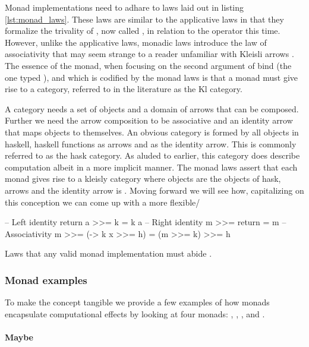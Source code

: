 Monad implementations need to adhare to laws laid out in listing
\ref{lst:monad_laws}. These laws are similar to the applicative laws
in that they formalize the trivality of , now called
, in relation to the  operator this
time. However, unlike the applicative laws, monadic laws introduce the
law of associativity that may seem strange to a reader unfamiliar with
Kleisli arrows \cite{dawsonCompoundMonadsKleisli2007}. The essence of
the monad, when focusing on the second argument of bind (the one typed
), and which is codified by the monad laws is that a
monad  must give rise to a category, referred to in the
literature as the Kl category.

A category needs a set of objects and a domain of arrows that can be
composed. Further we need the arrow composition to be associative and
an identity arrow that maps objects to themselves. An obvious category
is formed by all objects in haskell, haskell functions as arrows and
 as the identity arrow. This is commonly referred to as
the hask category. As aluded to earlier, this category does describe
computation albeit in a more implicit manner. The monad laws assert
that each monad gives rise to a kleisly category where objects are the
objects of hask, arrows  and the identity arrow is
. Moving forward we will see how, capitalizing on this
conception we can come up with a more flexible/

\begin{code}
\begin{haskellcode}
-- Left identity
return a >>= k = k a
-- Right identity
m >>= return = m
-- Associativity
m >>= (\x -> k x >>= h) = (m >>= k) >>= h
\end{haskellcode}
  \caption{\label{lst:monad_laws}Laws that any valid monad
    implementation must abide \cite{yorgeyTypeclassopedia2009}.}
\end{code}

\subsubsection{Monad examples}

To make the concept tangible we provide a few examples of how monads
encapsulate computational effects by looking at four monads: ,
 , , and .

\paragraph{Maybe}

